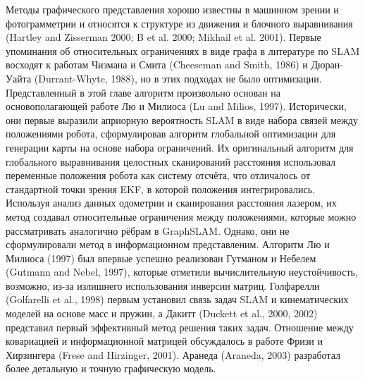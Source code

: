 \documentclass[10pt,a4paper]{article}
\begin{document}
Методы графического представления хорошо известны в машинном зрении и фотограмметрии и относятся к структуре из движения и блочного выравнивания (Hartley and Zisserman 2000; B et al. 2000; Mikhail et al. 2001). Первые упоминания об относительных ограничениях в виде графа в литературе по SLAM восходят к работам Чизмана и Смита (Cheeseman and Smith, 1986) и Дюран-Уайта (Durrant-Whyte, 1988), но в этих подходах не было оптимизации. Представленный в этой главе алгоритм произвольно основан на основополагающей работе Лю и Милиоса (Lu and Milios, 1997). Исторически, они первые выразили априорную вероятность SLAM в виде набора связей между положениями робота, сформулировав алгоритм глобальной оптимизации для генерации карты на основе набора ограничений. Их оригинальный алгоритм для глобального выравнивания целостных сканирований расстояния использовал переменные положения робота как систему отсчёта, что отличалось от стандартной точки зрения EKF, в которой положения интегрировались. Используя анализ данных одометрии и сканирования расстояния лазером, их метод создавал относительные ограничения между положениями, которые можно рассматривать аналогично рёбрам в GraphSLAM. Однако, они не сформулировали метод в информационном представленим. Алгоритм Лю и Милиоса (1997) был впервые успешно реализован Гутманом и Небелем (Gutmann and Nebel, 1997), которые отметили вычислительную неустойчивость, возможно, из-за излишнего использования инверсии матриц. Голфарелли (Golfarelli et al., 1998) первым установил связь задач SLAM и кинематических моделей на основе масс и пружин, а Дакитт (Duckett et al., 2000, 2002) представил первый эффективный метод решения таких задач. Отношение между ковариацией и информационной матрицей обсуждалось в работе Фризи и Хирзингера (Frese and Hirzinger, 2001). Аранеда (Araneda, 2003) разработал более детальную и точную графическую модель.
\end{document}
